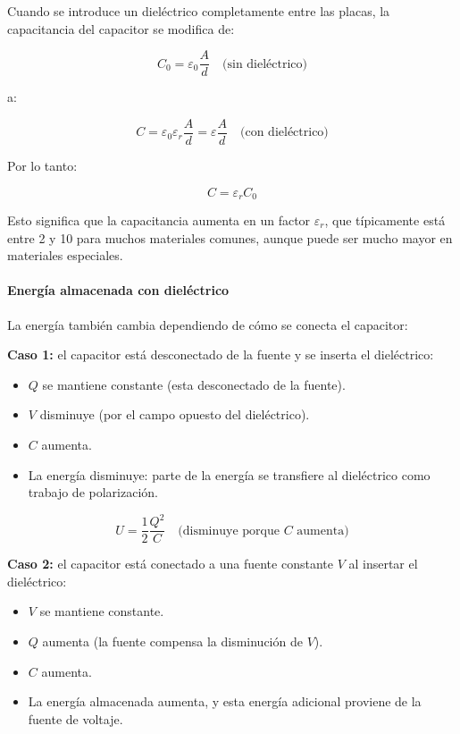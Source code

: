 Cuando se introduce un dieléctrico completamente entre las placas, la capacitancia del capacitor se modifica de:

\[
C_0 = \varepsilon_0 \frac{A}{d}
\quad \text{(sin dieléctrico)}
\]

a:

\[
C = \varepsilon_0 \varepsilon_r \frac{A}{d} = \varepsilon \frac{A}{d}
\quad \text{(con dieléctrico)}
\]

Por lo tanto:

\begin{equation}
    \boxed{C = \varepsilon_r C_0}
    \label{eq:capacitance_dielectric}
\end{equation}

Esto significa que la capacitancia aumenta en un factor \( \varepsilon_r \), que típicamente está entre 2 y 10 para muchos materiales comunes, aunque puede ser mucho mayor en materiales especiales.

\paragraph{Energía almacenada con dieléctrico}

La energía también cambia dependiendo de cómo se conecta el capacitor:

\textbf{Caso 1: } el capacitor está desconectado de la fuente y se inserta el dieléctrico:
\begin{itemize}
    \item \( Q \) se mantiene constante (esta desconectado de la fuente).
    \item \( V \) disminuye (por el campo opuesto del dieléctrico).
    \item \( C \) aumenta.
    \item La energía disminuye: parte de la energía se transfiere al dieléctrico como trabajo de polarización.
\end{itemize}

\[
U = \frac{1}{2} \frac{Q^2}{C} \quad \text{(disminuye porque } C \text{ aumenta)}
\]

\textbf{Caso 2: } el capacitor está conectado a una fuente constante \( V \) al insertar el dieléctrico:
\begin{itemize}
    \item \( V \) se mantiene constante.
    \item \( Q \) aumenta (la fuente compensa la disminución de \( V \)).
    \item \( C \) aumenta.
    \item La energía almacenada aumenta, y esta energía adicional proviene de la fuente de voltaje.
\end{itemize}

